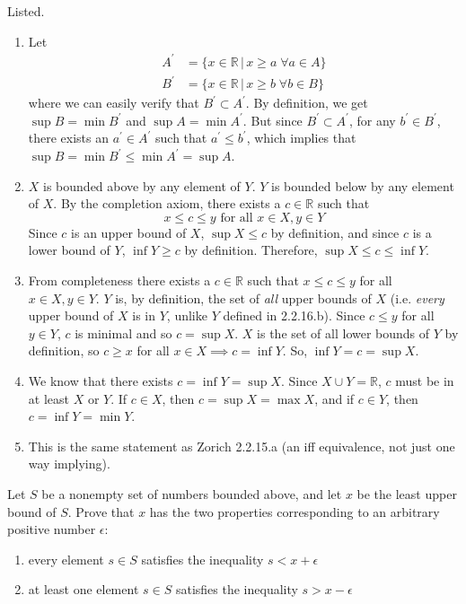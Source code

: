\documentclass{article}
\begin{document}
    \begin{solution}
    Listed. 
    \begin{enumerate}
        \item Let 
        \begin{align*}
            A^\prime & = \{ x \in \mathbb{R} \,|\, x \geq a \; \forall a \in A\} \\
            B^\prime & = \{ x \in \mathbb{R} \,|\, x \geq b \; \forall b \in B\}
        \end{align*}
        where we can easily verify that $B^\prime \subset A^\prime$. By definition, we get $\sup{B} = \min{B^\prime}$ and $\sup{A} = \min{A^\prime}$. But since $B^\prime \subset A^\prime$, for any $b^\prime \in B^\prime$, there exists an $a^\prime \in A^\prime$ such that $a^\prime \leq b^\prime$, which implies that $\sup{B} = \min{B^\prime} \leq \min{A^\prime} = \sup{A}$. 
        \item $X$ is bounded above by any element of $Y$. $Y$ is bounded below by any element of $X$. By the completion axiom, there exists a $c \in \mathbb{R}$ such that
        \[x \leq c \leq y \text{ for all } x \in X, y \in Y\]
        Since $c$ is an upper bound of $X$, $\sup{X} \leq c$ by definition, and since $c$ is a lower bound of $Y$, $\inf{Y} \geq c$ by definition. Therefore, $\sup{X} \leq c \leq \inf{Y}$. 
        \item From completeness there exists a $c \in \mathbb{R}$ such that $x \leq c \leq y$ for all $x \in X, y \in Y$. $Y$ is, by definition, the set of \textit{all} upper bounds of $X$ (i.e. \textit{every} upper bound of $X$ is in $Y$, unlike $Y$ defined in 2.2.16.b). Since $c \leq y$ for all $y \in Y$, $c$ is minimal and so $c = \sup{X}$. $X$ is the set of all lower bounds of $Y$ by definition, so $c \geq x$ for all $x \in X \implies c = \inf{Y}$. So, $\inf{Y} = c = \sup{X}$. 
        \item We know that there exists $c = \inf{Y} = \sup{X}$. Since $X \cup Y = \mathbb{R}$, $c$ must be in at least $X$ or $Y$. If $c \in X$, then $c = \sup{X} = \max{X}$, and if $c \in Y$, then $c = \inf{Y} = \min{Y}$. 
        \item This is the same statement as Zorich 2.2.15.a (an iff equivalence, not just one way implying). 
    \end{enumerate}
    \end{solution}

    \begin{exercise}[Olmsted 1.13]
    Let $S$ be a nonempty set of numbers bounded above, and let $x$ be the least upper bound of $S$. Prove that $x$ has the two properties corresponding to an arbitrary positive number $\epsilon$: 
    \begin{enumerate}
        \item every element $s \in S$ satisfies the inequality $s < x + \epsilon$
        \item at least one element $s \in S$ satisfies the inequality $s > x - \epsilon$
    \end{enumerate}
    \end{exercise}
\end{document}
